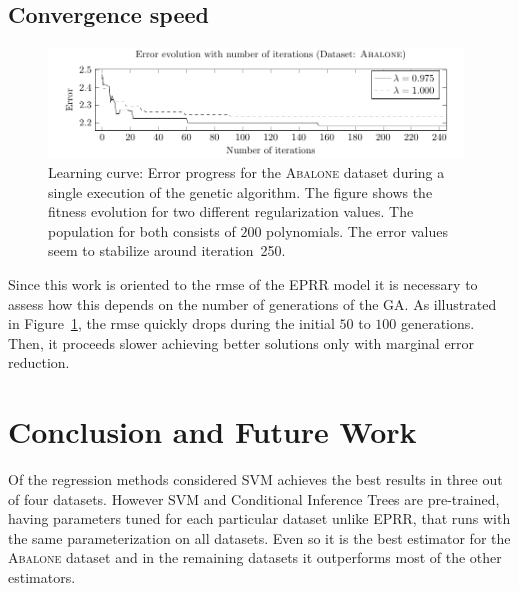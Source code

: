\documentclass[preprint,authoryear,12pt]{elsarticle}
\newcommand{\note}[1]{\textbf{\small{[Note: {#1}]}}}
\begin{document}
\subsection{Convergence speed}
%
\begin{figure}[tb]
\begin{center}
\includegraphics[width=0.98\textwidth]{figure_4.pdf}
\caption{Learning curve: Error progress for the \textsc{Abalone} dataset during a single execution of the genetic algorithm. The figure shows the fitness evolution for two different regularization values. The population for both consists of $200$ polynomials. The error values seem to stabilize around iteration~250.}
\label{Abalone_fitnessProgress}
\end{center}
\end{figure}
%
Since this work is oriented to the \ac{rmse} of the \ac{EPRR} model it is necessary to assess how this depends on the number of generations of the \ac{GA}. As illustrated in Figure~\ref{Abalone_fitnessProgress}, the \ac{rmse} quickly drops during the initial $50$ to $100$ generations. Then, it proceeds slower achieving better solutions only with marginal error reduction.


\section{Conclusion and Future Work}

Of the regression methods considered \ac{SVM} achieves the best results in three out of four datasets. However \ac{SVM} and Conditional Inference Trees are pre-trained, having parameters tuned for each particular dataset unlike \ac{EPRR}, that runs with the same parameterization on all datasets. Even so it is the best estimator for the \textsc{Abalone} dataset and in the remaining datasets it outperforms most of the other estimators. 
\end{document}
